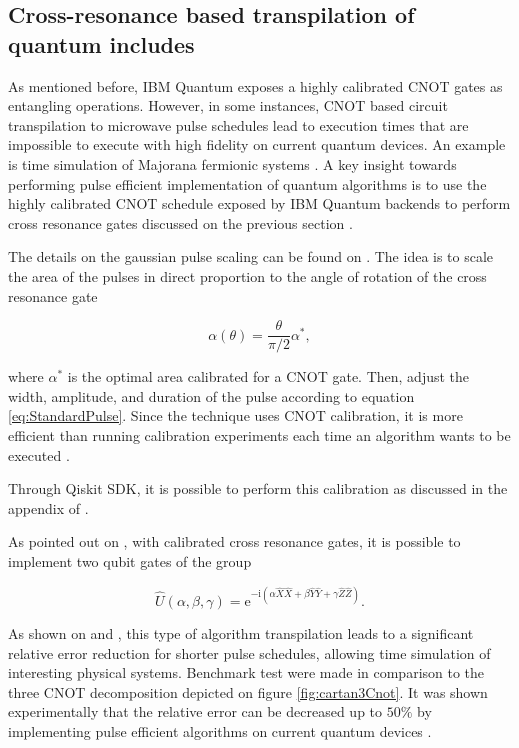   \subsection{Cross-resonance based transpilation of quantum includes}
  \label{subsec:CrossResonanceTranspilation}

    As mentioned before, IBM Quantum exposes a highly calibrated CNOT gates as entangling operations. However, in some instances, CNOT based circuit transpilation to microwave pulse schedules lead to execution times that are impossible to execute with high fidelity on current quantum devices. An example is time simulation of Majorana fermionic systems \cite{MajoranaSimulation}. A key insight towards performing pulse efficient implementation of quantum algorithms is to use the highly calibrated CNOT schedule exposed by IBM Quantum backends to perform cross resonance gates discussed on the previous section \cite{MajoranaSimulation, RXZPulseEfficient}. 
    
    The details on the gaussian pulse scaling can be found on \cite{MajoranaSimulation}. The idea is to scale the area of the pulses in direct proportion to the angle of rotation of the cross resonance gate

    \begin{equation}
      \alpha(\theta) = \frac{\theta}{\pi/2} \alpha^{*},
      \label{eq:SacaleingArea}
    \end{equation}
    
    \noindent where $\alpha^{*}$ is the optimal area calibrated for a CNOT gate. Then, adjust the width, amplitude, and duration of the pulse according to equation \ref{eq:StandardPulse}. Since the technique uses CNOT calibration, it is more efficient than running calibration experiments each time an algorithm wants to be executed \cite{MajoranaSimulation}.
    
    Through Qiskit SDK, it is possible to perform this calibration as discussed in the appendix of \cite{RXZPulseEfficient}.

    As pointed out on \cite{RXZPulseEfficient}, with calibrated cross resonance gates, it is possible to implement two qubit gates of the group

    \begin{equation}
      \hat{U}(\alpha, \beta, \gamma) = \mathrm{e}^{-\mathrm{i}(\alpha\hat{X}\hat{X} + \beta\hat{Y}\hat{Y} + \gamma\hat{Z}\hat{Z})}.
      \label{eq:CartanDecomp}
    \end{equation}

    

    As shown on \cite{RXZPulseEfficient} and \cite{MajoranaSimulation}, this type of algorithm transpilation leads to a significant relative error reduction for shorter pulse schedules, allowing time simulation of interesting physical systems. Benchmark test were made in comparison to the three CNOT decomposition depicted on figure \ref{fig:cartan3Cnot}. It was shown experimentally that the relative error can be decreased up to $50\%$ by implementing pulse efficient algorithms on current quantum devices \cite{RXZPulseEfficient}.



